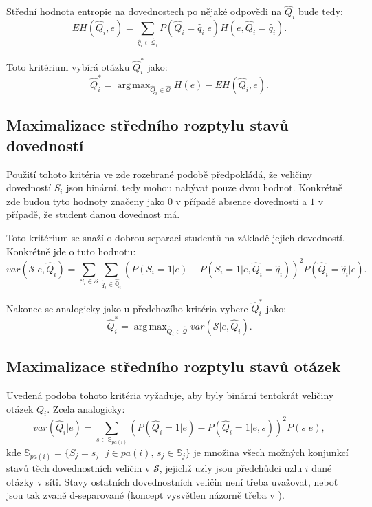 \documentclass[a4paper,twoside,12pt]{scrbook}
\DeclareMathOperator*{\argmax}{arg\,max}
\begin{document}
Střední hodnota entropie na dovednostech po nějaké odpovědi na $\widehat{Q}_i$ bude tedy:
\begin{equation}
	EH(\widehat{Q}_i,e) = \sum_{\widehat{q}_i \in \widehat{\mathbb{\mathcal{Q}}}_i}P(\widehat{Q}_i = \widehat{q}_i|e) H(e, \widehat{Q}_i = \widehat{q}_i).
\end{equation}

Toto kritérium vybírá otázku $\widehat{Q}^*_i$ jako:
\begin{equation}
	\widehat{Q}^*_i = \argmax_{\widehat{Q}_i \in \widehat{\mathcal{Q}}} H(e) - EH(\widehat{Q}_i,e).
\end{equation}

\subsection{Maximalizace středního rozptylu stavů dovedností}
Použití tohoto kritéria ve zde rozebrané podobě předpokládá, že veličiny dovedností $S_i$ jsou binární, tedy mohou nabývat pouze dvou hodnot. Konkrétně zde budou tyto hodnoty značeny jako $0$ v případě absence dovednosti a $1$ v případě, že student danou dovednost má.

Toto kritérium se snaží o dobrou separaci studentů na základě jejich dovedností. Konkrétně jde o tuto hodnotu:
\begin{equation}
	var(\mathcal{S}|e, \widehat{Q}_i) = \sum_{S_i \in \mathcal{S}}\sum_{\widehat{q}_i \in \widehat{\mathbb{Q}}_i} \left(P(S_i=1|e) - P(S_i=1|e, \widehat{Q}_i = \widehat{q}_i) \right)^2 P(\widehat{Q}_i = \widehat{q}_i|e).
\end{equation}

Nakonec se analogicky jako u předchozího kritéria vybere $\widehat{Q}^*_i$ jako:
\begin{equation}
	\widehat{Q}^*_i = \argmax_{\widehat{Q}_i \in \widehat{\mathcal{Q}}} var(\mathcal{S}|e, \widehat{Q}_i).
\end{equation}

\subsection{Maximalizace středního rozptylu stavů otázek}
Uvedená podoba tohoto kritéria vyžaduje, aby byly binární tentokrát veličiny otázek $Q_i$. Zcela analogicky:
\begin{equation}
	var(\widehat{Q}_i|e) = \sum_{s \in \mathbb{S}_{pa(i)}} \left(P(\widehat{Q}_i=1|e) - P(\widehat{Q}_i=1|e, s) \right)^2 P(s|e),
\end{equation}
kde $\mathbb{S}_{pa(i)}=\{S_j=s_j\,|\,j\in pa(i),\, s_j\in\mathbb{S}_j\}$ je množina všech možných konjunkcí stavů těch dovednostních veličin v $\mathcal{S}$, jejichž uzly jsou předchůdci uzlu $i$ dané otázky v síti. Stavy ostatních dovednostních veličin není třeba uvažovat, neboť jsou tak zvaně d-separované (koncept vysvětlen názorně třeba v \cite[strana 26 až 32]{Jensenc2007}).
\end{document}
